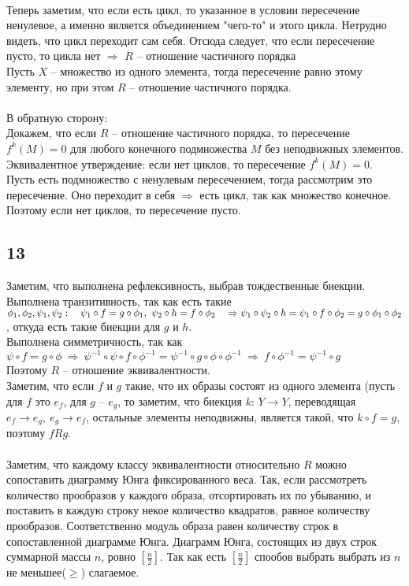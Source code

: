 		\\
		Теперь заметим, что если есть цикл, то указанное в условии пересечение ненулевое, а именно является объединением "чего-то" и этого цикла. Нетрудно видеть, что цикл переходит сам себя. Отсюда следует, что если пересечение пусто, то цикла нет $\Rightarrow$ $R$ -- отношение частичного порядка
		\\
		Пусть $X$ -- множество из одного элемента, тогда пересечение равно этому элементу, но при этом $R$ -- отношение частичного порядка.\\
		\\
		В обратную сторону: \\
		Докажем, что если $R$ -- отношение частичного порядка, то пересечение $f^k(M) = 0$ для любого конечного подмножества $M$ без неподвижных элементов. Эквивалентное утверждение: если нет циклов, то пересечение $f^k(M) = 0$. Пусть есть подмножество с ненулевым пересечением, тогда рассмотрим это пересечение. Оно переходит в себя $\Rightarrow$ есть цикл, так как множество конечное. Поэтому если нет циклов, то пересечение пусто.
		
		\subsection{13}
		Заметим, что выполнена рефлексивность, выбрав тождественные биекции.\\
		Выполнена транзитивность, так как есть такие $\phi_1, \phi_2, \psi_1, \psi_2: \quad \psi_1 \circ f = g \circ \phi_1,\ \psi_2 \circ h = f \circ \phi_2 \quad \Rightarrow \\
		\psi_1 \circ \psi_2 \circ h = \psi_1 \circ f \circ \phi_2 = g \circ \phi_1 \circ \phi_2$, откуда есть такие биекции для $g$ и $h$.\\
		Выполнена симметричность, так как $\psi \circ f = g \circ \phi \ \Rightarrow \ \psi^{-1} \circ \psi \circ f \circ \phi^{-1}  = \psi^{-1} \circ g \circ \phi \circ \phi^{-1}  \ \Rightarrow \
		f \circ \phi^{-1} = \psi^{-1} \circ g$\\
		Поэтому $R$ -- отношение эквивалентности. 
		\\
		Заметим, что если $f$ и $g$ такие, что их образы состоят из одного элемента (пусть для $f$ это $e_f$, для $g$ -- $e_g$, то заметим, что биекция $k$: $Y \to Y$, переводящая $e_f \to e_g,\ e_g \to e_f$, остальные элементы неподвижны, является такой, что $k \circ f = g$, поэтому $fRg$.\\
		\\
		Заметим, что каждому классу эквивалентности относительно $R$ можно сопоставить диаграмму Юнга фиксированного веса. Так, если рассмотреть количество прообразов у каждого образа, отсортировать их по убыванию, и поставить в каждую строку некое количество квадратов, равное количеству прообразов. Соответственно модуль образа равен количеству строк в сопоставленной диаграмме Юнга. Диаграмм Юнга, состоящих из двух строк суммарной массы $n$, ровно $[ \frac{n}{2} ]$. Так как есть $[ \frac{n}{2} ]$ спообов выбрать выбрать из $n$ не меньшее($\geqslant$) слагаемое.
		
